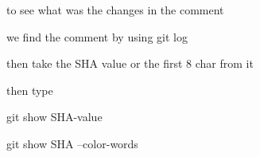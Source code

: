 to see what was the changes in the comment 

we find the comment by using git log 

then take the SHA value or the first 8 char from it 

then type 

git show SHA-value 

git show SHA --color-words 